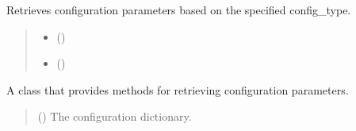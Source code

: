 \documentclass[a4paper,11pt,english,openany]{sphinxmanual}
\begin{document}
\begin{fulllineitems}
\begin{fulllineitems}
\end{fulllineitems}


\begin{fulllineitems}
\label{\detokenize{api/spyice.utils.config_sort:spyice.utils.config_sort.ConfigSort.getconfig_dataclass}}
\pysigstartsignatures
{}
\pysigstopsignatures
\sphinxAtStartPar
Retrieves configuration parameters based on the specified config\_type.
\begin{quote}\begin{description}
\begin{itemize}
\item {} 
\sphinxAtStartPar
{} ()

\item {} 
\sphinxAtStartPar
{} ()

\end{itemize}

\sphinxAtStartPar
{}

\end{description}\end{quote}

\end{fulllineitems}


\begin{fulllineitems}
\label{\detokenize{api/spyice.utils.config_sort:spyice.utils.config_sort.ConfigSort.__init__}}
\pysigstartsignatures
{}
\pysigstopsignatures
\sphinxAtStartPar
A class that provides methods for retrieving configuration parameters.
\begin{quote}\begin{description}
\sphinxAtStartPar
{} () \textendash{} The configuration dictionary.


\end{description}
\end{quote}
\end{fulllineitems}
\end{fulllineitems}
\end{document}
